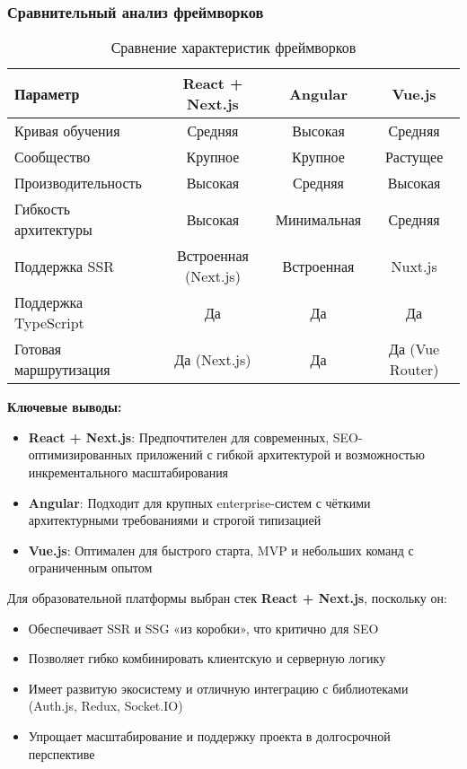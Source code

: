 \subsubsection{Сравнительный анализ фреймворков}

\begin{table}[h]
\small
\centering
\caption{Сравнение характеристик фреймворков}
\begin{tabular}{|l|c|c|c|}
\hline
\textbf{Параметр}         & React + Next.js & Angular  & Vue.js   \\ \hline
Кривая обучения           & Средняя         & Высокая  & Средняя  \\ \hline
Сообщество                & Крупное         & Крупное  & Растущее \\ \hline
Производительность        & Высокая         & Средняя  & Высокая  \\ \hline
Гибкость архитектуры      & Высокая         & Минимальная & Средняя  \\ \hline
Поддержка SSR             & Встроенная (Next.js) & Встроенная & Nuxt.js \\ \hline
Поддержка TypeScript      & Да              & Да       & Да       \\ \hline
Готовая маршрутизация     & Да (Next.js)    & Да       & Да (Vue Router) \\ \hline
\end{tabular}
\end{table}

\textbf{Ключевые выводы:}
\begin{itemize}
\item \textbf{React + Next.js}: Предпочтителен для современных, SEO-оптимизированных приложений с гибкой архитектурой и возможностью инкрементального масштабирования
\item \textbf{Angular}: Подходит для крупных enterprise-систем с чёткими архитектурными требованиями и строгой типизацией
\item \textbf{Vue.js}: Оптимален для быстрого старта, MVP и небольших команд с ограниченным опытом
\end{itemize}

Для образовательной платформы выбран стек \textbf{React + Next.js}, поскольку он:
\begin{itemize}
\item Обеспечивает SSR и SSG «из коробки», что критично для SEO
\item Позволяет гибко комбинировать клиентскую и серверную логику
\item Имеет развитую экосистему и отличную интеграцию с библиотеками (Auth.js, Redux, Socket.IO)
\item Упрощает масштабирование и поддержку проекта в долгосрочной перспективе
\end{itemize}


